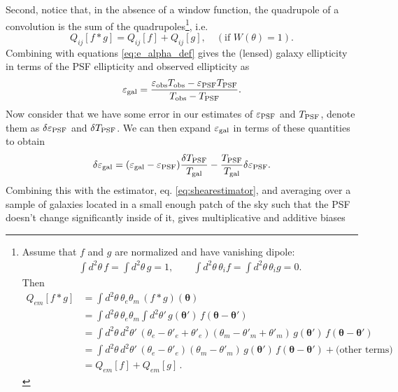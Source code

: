 \documentclass[11pt]{book}
\DeclareRobustCommand{\PSF}{\ifmmode\text{PSF}\else d\fi}
\DeclareRobustCommand{\gal}{\ifmmode\text{gal}\else d\fi}
\DeclareRobustCommand{\obs}{\ifmmode\text{obs}\else d\fi}
\begin{document}
	Second, notice that, in the absence of a window function, the quadrupole of a convolution is the sum of the quadrupoles\footnote{
	Assume that $f$ and $g$ are normalized and have vanishing dipole:
	\begin{align*}
	\int d^2\theta \, f = \int d^2\theta \, g = 1,
	\qquad
	\int d^2\theta \, \theta_i f = \int d^2\theta \, \theta_i g = 0.
	\end{align*}
	Then
	\begin{align*}
	Q_{em}[f * g]
	&= \int d^2\theta \, \theta_e \theta_m \, (f * g)(\boldsymbol{\theta}) \\
	&= \int d^2\theta \, \theta_e \theta_m \int d^2\theta' \, g(\boldsymbol{\theta}') \, f(\boldsymbol{\theta} - \boldsymbol{\theta}') \\
	&= \int d^2\theta \, d^2\theta' \, 
	(\theta_e - \theta'_e + \theta'_e)(\theta_m - \theta'_m + \theta'_m)
	\, g(\boldsymbol{\theta}') \, f(\boldsymbol{\theta} - \boldsymbol{\theta}') \\
	&= \int d^2\theta \, d^2\theta' \,
	(\theta_e - \theta'_e)(\theta_m - \theta'_m)
	\, g(\boldsymbol{\theta}') \, f(\boldsymbol{\theta} - \boldsymbol{\theta}')
	+ \text{(other terms)} \\
	&= Q_{em}[f] + Q_{em}[g] \, .
	\end{align*}
	}, i.e.
	\begin{equation}
		Q_{ij}[f\ast g]=Q_{ij}[f]+Q_{ij}[g], \quad (\text{if }W(\theta)=1).
	\end{equation}
	Combining with equations \ref{eq:e_alpha_def} gives the (lensed) galaxy ellipticity in terms of the PSF ellipticity and observed ellipticity as
	\begin{equation}
		\varepsilon_\gal = \frac{\varepsilon_\obs T_\obs-\varepsilon_\PSF T_\PSF}{T_\obs-T_\PSF}.
	\end{equation}
	Now consider that we have some error in our estimates of $\varepsilon_\PSF$ and $T_\PSF$, denote them as $\delta\varepsilon_\PSF$ and $\delta T_\PSF$. We can then expand $\varepsilon_\gal$ in terms of these quantities to obtain
	\begin{equation}
		\delta\varepsilon_\gal = (\varepsilon_\gal - \varepsilon_\PSF)\frac{\delta T_\PSF}{T_\gal} - \frac{T_\PSF}{T_\gal}\delta\varepsilon_\PSF.
	\end{equation}
	Combining this with the estimator, eq. \ref{eq:shearestimator}, and averaging over a sample of galaxies located in a small enough patch of the sky such that the PSF doesn't change significantly inside of it, gives multiplicative and additive biases
\end{document}

